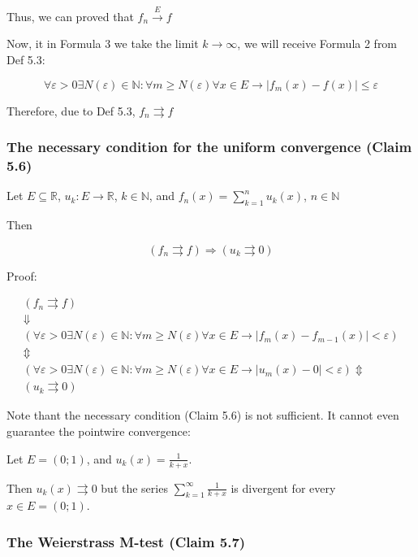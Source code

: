 Thus, we can proved that \(f_n \xrightarrow{E} f\)

Now, it in Formula 3 we take the limit \(k \rightarrow \infty\), we will receive Formula 2 from Def 5.3:

\[
    \forall \varepsilon > 0 \exists N(\varepsilon) \in \mathbb{N}: \forall m \geq N(\varepsilon) \forall x \in E \rightarrow \left| f_m(x) - f(x) \right| \leq \varepsilon
\]

Therefore, due to Def 5.3, \(f_n \rightrightarrows f \)

\subsubsection{The necessary condition for the uniform convergence (Claim 5.6)}

Let \(E \subseteq \mathbb{R}\), \(u_k: E \rightarrow \mathbb{R}\), \(k \in \mathbb{N}\), and \(f_n(x) = \sum_{k = 1}^{n}u_k(x)\), \(n \in \mathbb{N}\)

Then

\[
    \left( f_n \rightrightarrows f \right) \Rightarrow \left( u_k \rightrightarrows 0 \right)
\]

Proof:

\begin{gather*}
    \left( f_n \rightrightarrows f \right) \\
    \Downarrow \\
    \left( \forall \varepsilon>0 \exists N(\varepsilon) \in \mathbb{N}: \forall m \geqslant N(\varepsilon) \forall x \in E \rightarrow \left| f_m(x) - f_{m - 1}(x) \right| < \varepsilon \right) \\
    \Updownarrow \\
    \left(\forall \varepsilon>0 \exists N(\varepsilon) \in \mathbb{N}: \forall m \geqslant N(\varepsilon) \forall x \in E \rightarrow\left|u_m(x)-0\right|<\varepsilon\right)
    \Updownarrow \\
    \left( u_k \rightrightarrows 0 \right)
\end{gather*}

Note thant the necessary condition (Claim 5.6) is not sufficient. It cannot even guarantee the pointwire convergence:

Let \(E=(0 ; 1)\), and \(u_k(x)=\frac{1}{k+x}\).

Then \(u_k(x) \rightrightarrows 0\) but the series \(\sum_{k=1}^{\infty} \frac{1}{k+x}\) is divergent for every \(x \in E=(0 ; 1)\).

\subsubsection{The Weierstrass M-test (Claim 5.7)}

